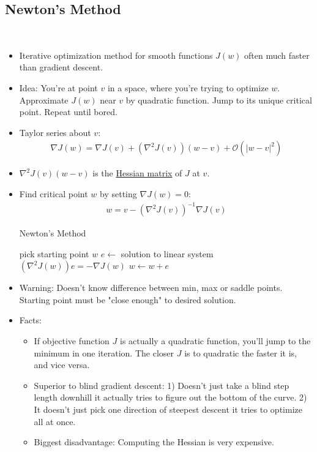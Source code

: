 \documentclass[10pt]{article}
\begin{document}
	\subsection*{Newton's Method}
	\
		\begin{itemize}
			\item Iterative optimization method for smooth functions $J(w)$ often much faster than gradient descent.
			\item Idea: You're at point $v$ in a space, where you're trying to optimize $w$. Approximate $J(w)$ near $v$ by quadratic function. Jump to its unique critical point. Repeat until bored.
			\item Taylor series about $v$:
				\begin{align*}
					\nabla J(w) = \nabla J(v) + (\nabla^{2}J(v))(w-v) + \mathcal{O}(|w - v|^{2})
				\end{align*}
			\item $\nabla^{2}J(v)(w-v)$ is the \underline{Hessian matrix} of $J$ at $v$.
			\item Find critical point $w$ by setting $\nabla J(w) = 0$:
				\begin{align*}
					w = v - (\nabla^{2}J(v))^{-1}\nabla J(v)
				\end{align*} 
				\begin{algorithm*}
					\caption{Newton's Method}
					\begin{algorithmic}
						\State pick starting point $w$
						\State $e \leftarrow$ solution to linear system $(\nabla^{2}J(w))e = -\nabla J(w)$
						\State $w \leftarrow w + e$
						\EndWhile
					\end{algorithmic}
				\end{algorithm*}
			\item Warning: Doesn't know difference between min, max or saddle points. Starting point must be "close enough" to desired solution.
			\item Facts:
				\begin{itemize}
					\item If objective function $J$ is actually a quadratic function, you'll jump to the minimum in one iteration. The closer $J$ is to quadratic the faster it is, and vice versa.
					\item Superior to blind gradient descent: 1) Doesn't just take a blind step length downhill it actually tries to figure out the bottom of the curve. 2) It doesn't just pick one direction of steepest descent it tries to optimize all at once.
					\item Biggest disadvantage: Computing the Hessian is very expensive. 
				\end{itemize}
		\end{itemize}
		
\end{document}
